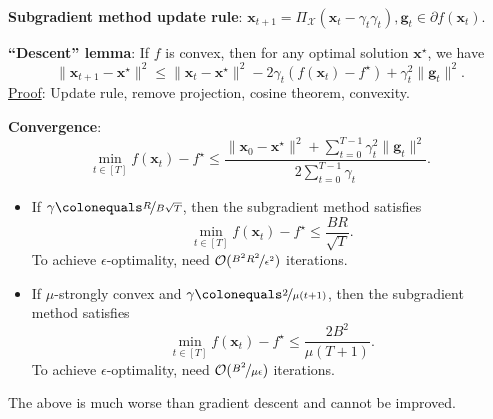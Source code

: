 \documentclass{article}
\renewcommand{\vec}[1]{\mathbf{#1}}
\newenvironment{topic}[1]
{\textbf{\sffamily \colorbox{black}{\rlap{\textbf{\textcolor{white}{#1}}}\hspace{\linewidth}\hspace{-2\fboxsep}}} \\ \vspace{0.2cm}}
{}
\begin{document}
\begin{multicols*}{2}
\begin{topic}{Subgradient method}
        \textbf{Subgradient method update rule}: $\vec{x}_{t+1} = \Pi_{\mathcal{X}}(\vec{x}_t - \gamma_t \gamma_t), \vec{g}_t \in \partial f(\vec{x}_t)$.

        \textbf{``Descent'' lemma}: If $f$ is convex, then for any optimal solution $\vec{x}^\star$, we have \[
            \| \vec{x}_{t+1} - \vec{x}^\star \|^2 \leq \| \vec{x}_t - \vec{x}^\star \|^2 - 2 \gamma_t (f(\vec{x}_t) - f^\star) + \gamma_t^2 \| \vec{g}_t \|^2.
        \]
        \underline{Proof}: Update rule, remove projection, cosine theorem, convexity.

        \textbf{Convergence}: \[
            \min_{t \in [T]} f(\vec{x}_t) - f^\star \leq \frac{\| \vec{x}_0 - \vec{x}^\star \|^2 + \sum_{t=0}^{T-1} \gamma_t^2 \|\vec{g}_t\|^2}{2 \sum_{t=0}^{T-1} \gamma_t}.
        \]
        \begin{itemize}
            \item If $\gamma \colonequals \nicefrac{R}{B \sqrt{T}}$, then the subgradient method satisfies \[
                      \min_{t \in [T]} f(\vec{x}_t) - f^\star \leq \frac{BR}{\sqrt{T}}.
                  \]
                  To achieve $\epsilon$-optimality, need $\mathcal{O}(\nicefrac{B^2 R^2}{\epsilon^2})$ iterations.
            \item If $\mu$-strongly convex and $\gamma \colonequals \nicefrac{2}{\mu(t+1)}$, then the subgradient
                  method satisfies \[
                      \min_{t \in [T]} f(\vec{x}_t) - f^\star \leq \frac{2B^2}{\mu(T+1)}.
                  \]
                  To achieve $\epsilon$-optimality, need $\mathcal{O}(\nicefrac{B^2}{\mu \epsilon})$ iterations.
        \end{itemize}
        The above is much worse than gradient descent and cannot be improved.

    \end{topic}

\end{multicols*}
\end{document}
